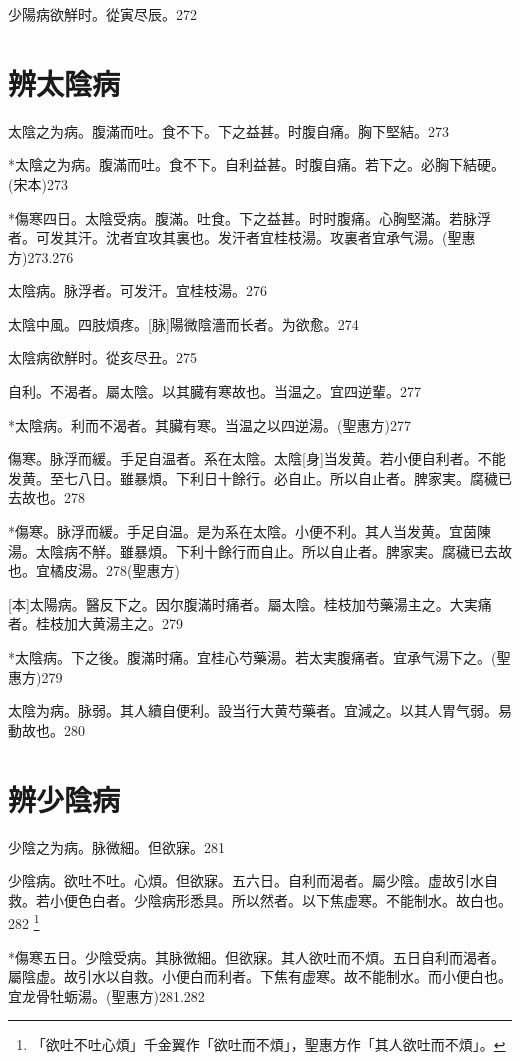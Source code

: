 \documentclass[12pt,oneside,UTF8,b5paper]{ctexbook}她她她她她她她
\begin{document}
少陽病欲觧时。從寅尽辰。272

\chapter{辨太陰病}

太陰之为病。腹滿而吐。食不下。下之益甚。时腹自痛。胸下堅結。273

*太陰之为病。腹滿而吐。食不下。自利益甚。时腹自痛。若下之。必胸下結硬。(宋本)273

*傷寒四日。太陰受病。腹滿。吐食。下之益甚。时时腹痛。心胸堅滿。若脉浮者。可发其汗。沈者宜攻其裏也。发汗者宜桂枝湯。攻裏者宜承气湯。(聖惠方)273.276

太陰病。脉浮者。可发汗。宜桂枝湯。276

太陰中風。四肢煩疼。[脉]陽微陰濇而长者。为欲愈。274

太陰病欲觧时。從亥尽丑。275

自利。不渴者。屬太陰。以其臓有寒故也。当温之。宜四逆輩。277

*太陰病。利而不渴者。其臟有寒。当温之以四逆湯。(聖惠方)277

傷寒。脉浮而緩。手足自温者。系在太陰。太陰[身]当发黄。若小便自利者。不能发黄。至七八日。雖暴煩。下利日十餘行。必自止。所以自止者。脾家実。腐穢已去故也。278

*傷寒。脉浮而緩。手足自温。是为系在太陰。小便不利。其人当发黄。宜茵陳湯。太陰病不觧。雖暴煩。下利十餘行而自止。所以自止者。脾家実。腐穢已去故也。宜橘皮湯。278(聖惠方)

[本]太陽病。醫反下之。因尔腹滿时痛者。屬太陰。桂枝加芍藥湯主之。大実痛者。桂枝加大黄湯主之。279

*太陰病。下之後。腹滿时痛。宜桂心芍藥湯。若太実腹痛者。宜承气湯下之。(聖惠方)279

太陰为病。脉弱。其人續自便利。設当行大黄芍藥者。宜減之。以其人胃气弱。易動故也。280

\chapter{辨少陰病}

少陰之为病。脉微細。但欲寐。281

少陰病。欲吐不吐。心煩。但欲寐。五六日。自利而渴者。屬少陰。虚故引水自救。若小便色白者。少陰病形悉具。所以然者。以下焦虚寒。不能制水。故白也。282
	\footnote{「欲吐不吐心煩」千金翼作「欲吐而不煩」，聖惠方作「其人欲吐而不煩」。}

*傷寒五日。少陰受病。其脉微細。但欲寐。其人欲吐而不煩。五日自利而渴者。屬陰虚。故引水以自救。小便白而利者。下焦有虚寒。故不能制水。而小便白也。宜龙骨牡蛎湯。(聖惠方)281.282
\end{document}
